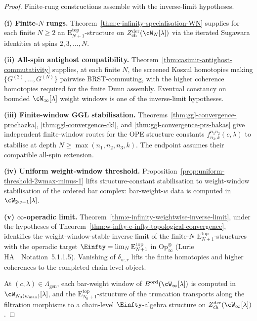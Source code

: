 \begin{proof}
Finite-rung constructions assemble with the inverse-limit
hypotheses.

\textbf{(i) Finite-$N$ rungs.}
Theorem~\ref{thm:e-infinity-specialisation-WN} supplies for each
finite $N \ge 2$ an $\mathrm{E}_{N+1}^{\mathrm{top}}$-structure on
$Z^{\mathrm{der}}_{\mathrm{ch}}(\cW_N[\lambda])$ via the iterated
Sugawara identities at spins $2, 3, \ldots, N$.

\textbf{(ii) All-spin antighost compatibility.}
Theorem~\ref{thm:casimir-antighost-commutativity} supplies, at
each finite \(N\), the screened Koszul homotopies making
\(\{G^{(2)},\ldots,G^{(N)}\}\) pairwise BRST-commuting, with the
higher coherence homotopies required for the finite Dunn assembly.
Eventual constancy on bounded \(\cW_\infty[\lambda]\) weight
windows is one of the inverse-limit hypotheses.

\textbf{(iii) Finite-window GGL stabilisation.}
Theorems~\ref{thm:ggl-convergence-prochazka},
\ref{thm:ggl-convergence-ckl}, and
\ref{thm:ggl-convergence-prs-bakas} give independent finite-window
routes for the OPE structure constants
$f^{n_1 n_2}_{n_3, k}(c, \lambda)$ to stabilise at depth
$N \ge \max(n_1, n_2, n_3, k)$. The endpoint assumes their
compatible all-spin extension.

\textbf{(iv) Uniform weight-window threshold.}
Proposition~\ref{prop:uniform-threshold-2wmax-minus-1} lifts
structure-constant stabilisation to weight-window stabilisation
of the ordered bar complex: bar-weight-$w$ data is computed in
$\cW_{2w - 1}[\lambda]$.

\textbf{(v) $\infty$-operadic limit.}
Theorem~\ref{thm:e-infinity-weightwise-inverse-limit}, under the
hypotheses of
Theorem~\ref{thm:w-infty-e-infty-topological-convergence},
identifies the weight-window-stable inverse limit of the
finite-$N$ $\mathrm{E}_{N+1}^{\mathrm{top}}$-structures with the
operadic target
$\Einfty = \lim_N \mathrm{E}_{N+1}^{\mathrm{top}}$ in
$\mathrm{Op}_\infty^{\otimes}$
(Lurie HA~\cite{HA}~Notation~5.1.1.5). Vanishing of
\(\delta_{w,r}\) lifts the finite homotopies and higher
coherences to the completed chain-level object.

At $(c, \lambda) \in \Lambda_{\mathrm{gen}}$, each bar-weight
window of $B^{\mathrm{ord}}(\cW_\infty[\lambda])$ is computed in
$\cW_{N_0(w_{\max})}[\lambda]$, and the
$\mathrm{E}_{N_0 + 1}^{\mathrm{top}}$-structure of the truncation
transports along the filtration morphisms to a chain-level
$\Einfty$-algebra structure on
$Z^{\mathrm{der}}_{\mathrm{ch}}(\cW_\infty[\lambda])$.
\end{proof}


